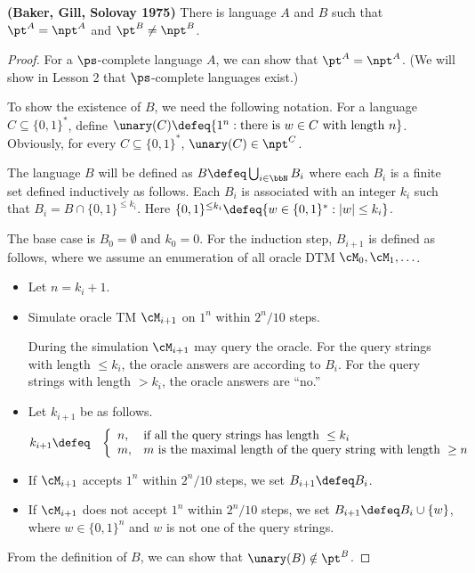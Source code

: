 \documentclass[11pt, a4paper]{article}
\begin{document}
\begin{theorem}
\label{theo:TM-oracle}
{\bf (Baker, Gill, Solovay 1975)}
There is language $A$ and $B$ such that $\pt^A=\npt^A$ and $\pt^B\neq \npt^B$. 
\end{theorem}
\begin{proof}
For a $\ps$-complete language $A$,
we can show that $\pt^A = \npt^A$.
(We will show in Lesson 2 that $\ps$-complete languages exist.)

To show the existence of $B$,
we need the following notation.
For a language $C\subseteq \{0,1\}^*$, define $\unary(C) \defeq \{1^n : \text{there is}\ w \in C \ \text{with length}\ n\}$.
Obviously, for every $C\subseteq \{0,1\}^*$, $\unary(C)\in \npt^C$.

The language $B$ will be defined as $B\defeq\bigcup_{i\in \bbN}B_i$ 
where each $B_i$ is a finite set defined inductively as follows.
Each $B_i$ is associated with an integer $k_i$ such that $B_i = B \cap \{0,1\}^{\leq k_i}$.
Here $\{0,1\}^{\leq k_i}\defeq\{w \in \{0,1\}^* : |w|\leq k_i\}$.

The base case is $B_0=\emptyset$ and $k_0=0$.
For the induction step, $B_{i+1}$ is defined as follows,
where we assume an enumeration of all oracle DTM $\cM_0,\cM_1,\ldots$.
\begin{itemize}\itemsep=0pt
\item 
Let $n = k_i+1$.
\item
Simulate oracle TM $\cM_{i+1}$ on $1^n$ within $2^n/10$ steps.

During the simulation $\cM_{i+1}$ may query the oracle.
For the query strings with length $\leq k_i$, 
the oracle answers are according to $B_i$.
For the query strings with length $> k_i$, the oracle answers are ``no.''  
\item
Let $k_{i+1}$ be as follows.
\begin{eqnarray*}
k_{i+1} & \defeq & 
\left\{
\begin{array}{ll}
n, & \text{if all the query strings has length}\ \leq k_i
\\
m, & m \ \text{is the maximal length of the query string with length} \ \geq n
\end{array}
\right.
\end{eqnarray*}
\item
If $\cM_{i+1}$ accepts $1^n$ within $2^n/10$ steps,
we set $B_{i+1}\defeq B_i$.
\item
If $\cM_{i+1}$ does not accept $1^n$ within $2^n/10$ steps,
we set $B_{i+1}\defeq B_i \cup \{w\}$, where $w\in \{0,1\}^n$ and $w$ is not one of the query strings.
\end{itemize}
From the definition of $B$, 
we can show that $\unary(B)\notin \pt^B$.
\end{proof}
\end{document}
